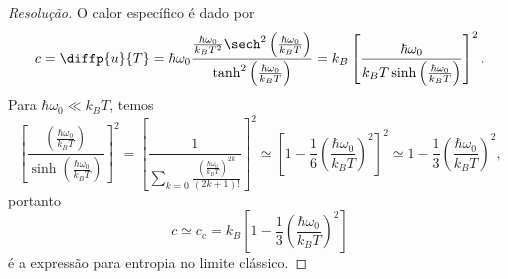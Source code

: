 \begin{proof}[Resolução]
    O calor específico é dado por
    \begin{equation*}
        c = \diffp{u}{T} = \hbar \omega_0 \frac{\frac{\hbar\omega_0}{k_BT^2}\sech^2\left(\frac{\hbar \omega_0}{k_B T}\right)}{\tanh^2\left(\frac{\hbar\omega_0}{k_B T}\right)} = k_B\left[\frac{\hbar \omega_0}{k_B T\sinh\left(\frac{\hbar \omega_0}{k_BT}\right)}\right]^2.
    \end{equation*}
    Para \(\hbar \omega_0\ll k_BT\), temos
    \begin{equation*}
        \left[\frac{\left(\frac{\hbar\omega_0}{k_BT}\right)}{\sinh{\left(\frac{\hbar\omega_0}{k_BT}\right)}}\right]^2 = \left[\frac{1}{\sum_{k=0} \frac{\left(\frac{\hbar\omega_0}{k_BT}\right)^{2k}}{(2k+1)!}}\right]^2 \simeq \left[1 - \frac16\left(\frac{\hbar\omega_0}{k_BT}\right)^2\right]^2 \simeq 1 - \frac13\left(\frac{\hbar\omega_0}{k_BT}\right)^2,
    \end{equation*}
    portanto
    \begin{equation*}
        c\simeq c_\mathrm{c} = k_B\left[1 - \frac13\left(\frac{\hbar \omega_0}{k_B T}\right)^2\right]
    \end{equation*}
    é a expressão para entropia no limite clássico.
\end{proof}
